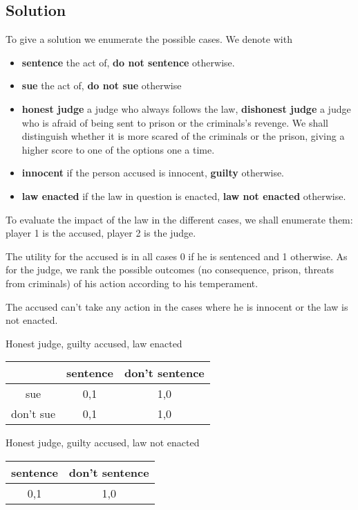 \documentclass[a4paper, 12pt]{article}
\begin{document}
\subsection{Solution}
To give a solution we enumerate the possible cases. We denote with
\begin{itemize}
	\item \textbf{sentence} the act of, \textbf{do not sentence} otherwise.
	\item \textbf{sue} the act of, \textbf{do not sue} otherwise
	\item \textbf{honest judge} a judge who always follows the law, \textbf{dishonest judge} a judge
	who is afraid of being sent to prison or the criminals's revenge. We shall distinguish whether it is
	more scared of the criminals or the prison, giving a higher score to one of the options one a time.
	\item \textbf{innocent} if the person accused is innocent, \textbf{guilty} otherwise.
	\item \textbf{law enacted} if the law in question is enacted, \textbf{law not enacted} otherwise.
\end{itemize}


To evaluate the impact of the law in the different cases, we shall enumerate
them: player 1 is the accused, player 2 is the judge.

The utility for the accused is in all cases 0 if he is sentenced and 1
otherwise. As for the judge, we rank the possible outcomes (no consequence,
prison, threats from criminals) of his action according to his temperament.

The accused can't take any action in the cases where he is innocent or the law
is not enacted.

\begin{center}
  Honest judge, guilty accused, law enacted
  \\
  \begin{tabular}{|c|c|c|}
	\hline
	& sentence & don't sentence \\\hline
	sue &  0,1 & 1,0 \\\hline
	don't sue & 0,1 & 1,0 \\\hline
  \end{tabular}
\end{center}

\begin{center}
  Honest judge, guilty accused, law not enacted
  \\
  \begin{tabular}{|c|c|}
	\hline
	sentence & don't sentence \\\hline
	0,1 & 1,0 \\\hline
  \end{tabular}
\end{center}
\end{document}
